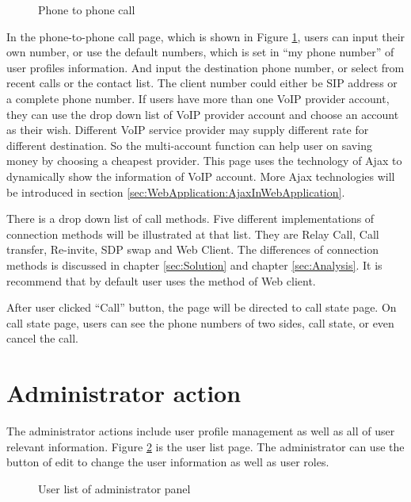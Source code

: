 \begin{figure}[!hbtp]
\centering
{}
\caption{Phone to phone call}
\label{fig:PhoneToPhoneCall}
\end{figure} 

In the phone-to-phone call page, which is shown in Figure \ref{fig:PhoneToPhoneCall}, users can input their own number, or use the default numbers, which is set in ``my phone number'' of user profiles information. And input the destination phone number, or select from recent calls or the contact list. The client number could either be SIP address or a complete phone number. If users have more than one VoIP provider account, they can use the drop down list of VoIP provider account and choose an account as their wish. Different VoIP service provider may supply different rate for different destination. So the multi-account function can help user on saving money by choosing a cheapest provider. This page uses the technology of Ajax to dynamically show the information of VoIP account. More Ajax technologies will be introduced in section \ref{sec:WebApplication:AjaxInWebApplication}. 

There is a drop down list of call methods. Five different implementations of connection methods will be illustrated at that list. They are \textsf{Relay Call}, \textsf{Call transfer}, \textsf{Re-invite}, \textsf{SDP swap} and \textsf{Web Client}.  The differences of connection methods is discussed in chapter \ref{sec:Solution} and chapter \ref{sec:Analysis}. It is recommend that by default user uses the method of Web client. 

After user clicked ``Call'' button, the page will be directed to call state page. On call state page, users can see the phone numbers of two sides, call state, or even cancel the call.

\section{Administrator action}
\label{sec:WebApplication:AdministratorAction}

The administrator actions include user profile management as well as all of user relevant information. 
Figure \ref{fig:UserListOfAdministratorPanel} is the user list page. The administrator can use the button of edit to change the user information as well as user roles.

\begin{figure}[!hbtp]
\centering
{}
\caption{User list of administrator panel}
\label{fig:UserListOfAdministratorPanel}
\end{figure} 

